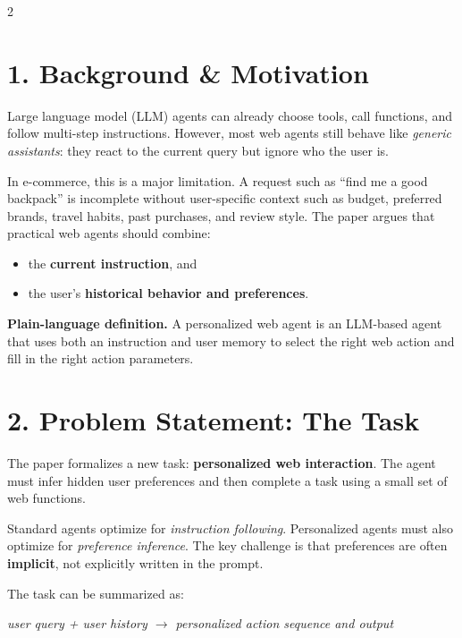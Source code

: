\documentclass{article}
\begin{document}
\begin{multicols}{2}

\section*{1. Background \& Motivation}
Large language model (LLM) agents can already choose tools, call functions, and follow multi-step instructions. However, most web agents still behave like \emph{generic assistants}: they react to the current query but ignore who the user is.

In e-commerce, this is a major limitation. A request such as ``find me a good backpack'' is incomplete without user-specific context such as budget, preferred brands, travel habits, past purchases, and review style. The paper argues that practical web agents should combine:

\begin{itemize}[leftmargin=1.1em,itemsep=0.2em,topsep=0.2em]
	\item the \textbf{current instruction}, and
	\item the user's \textbf{historical behavior and preferences}.
\end{itemize}

\textbf{Plain-language definition.} A personalized web agent is an LLM-based agent that uses both an instruction and user memory to select the right web action and fill in the right action parameters.

\section*{2. Problem Statement: The Task}
The paper formalizes a new task: \textbf{personalized web interaction}. The agent must infer hidden user preferences and then complete a task using a small set of web functions.

\begin{tcolorbox}[colback=gray!4,colframe=gray!55!black,title=Why this is different from a standard web agent]
Standard agents optimize for \emph{instruction following}. Personalized agents must also optimize for \emph{preference inference}. The key challenge is that preferences are often \textbf{implicit}, not explicitly written in the prompt.
\end{tcolorbox}

The task can be summarized as:\\
\centerline{\emph{user query + user history $\rightarrow$ personalized action sequence and output}}


\end{multicols}
\end{document}
